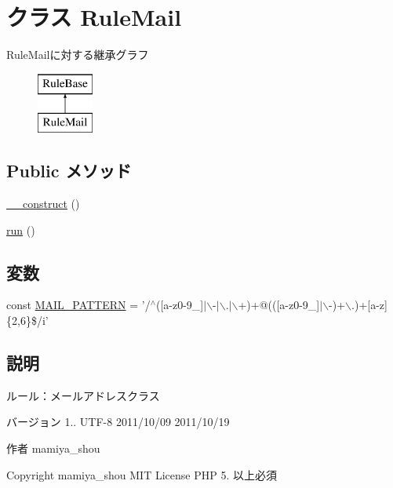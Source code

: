 \hypertarget{class_rule_mail}{
\section{クラス \-Rule\-Mail}
\label{class_rule_mail}
}
\-Rule\-Mailに対する継承グラフ\begin{figure}[H]
\begin{center}
\leavevmode
\includegraphics[height=2.000000cm]{class_rule_mail}
\end{center}
\end{figure}
\subsection*{\-Public メソッド}
\begin{DoxyCompactItemize}
\item 
\hyperlink{class_rule_mail_a095c5d389db211932136b53f25f39685}{\-\_\-\-\_\-construct} ()
\item 
\hyperlink{class_rule_mail_afb0fafe7e02a3ae1993c01c19fad2bae}{run} ()
\end{DoxyCompactItemize}
\subsection*{変数}
\begin{DoxyCompactItemize}
\item 
const \hyperlink{class_rule_mail_ae120b9206d39e1922b268a74697c4775}{\-M\-A\-I\-L\-\_\-\-P\-A\-T\-T\-E\-R\-N} = '/$^\wedge$(\mbox{[}a-\/z0-\/9\-\_\-\mbox{]}$|$$\backslash$-\/$|$$\backslash$.$|$$\backslash$+)+@((\mbox{[}a-\/z0-\/9\-\_\-\mbox{]}$|$$\backslash$-\/)+$\backslash$.)+\mbox{[}a-\/z\mbox{]}\{2,6\}\$/i'
\end{DoxyCompactItemize}


\subsection{説明}
ルール：メールアドレスクラス

\begin{DoxyVersion}{バージョン}
1..  \-U\-T\-F-\/8  2011/10/09  2011/10/19 
\end{DoxyVersion}
\begin{DoxyAuthor}{作者}
mamiya\-\_\-shou 
\end{DoxyAuthor}
\begin{DoxyCopyright}{\-Copyright}
mamiya\-\_\-shou  \-M\-I\-T \-License  \-P\-H\-P 5. 以上必須 
\end{DoxyCopyright}


